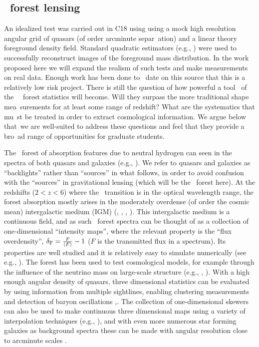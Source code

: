 \subsection{\lya\ forest lensing}


An idealized test was carried out in C18 using using a mock high
resolution angular grid of quasars (of order arcminute separ\ ation)
and a linear theory foreground density field. Standard quadratic
estimators (e.g., \cite{okamoto}) were used to successfully
reconstruct images of the foreground mass distribution. In the work
proposed here we will expand the realism of such tests and make
measurements on real data. Enough work has been done to \ date on this
source that this is a relatively low risk project. There is still the
question of how powerful a tool \atf\ of the \lya\ \ forest statistics
will become. Will they surpass the more traditional shape
mea\ surements for at least some range of redshift? What are the
systematics that mu\ st be treated in order to extract cosmological
information. We argue below that\ we are well-suited to address these
questions and feel that they provide a bro\ ad range of opportunities
for graduate students.




The \lya\ forest of absorption features due to neutral hydrogen can
seen in the spectra of both quasars \cite{rauch1998} and galaxies (e.g.,
\cite{savaglio2002}).  We refer to quasars and galaxies as
``backlights'' rather than ``sources'' in what follows, in order to
avoid confusion with the ``sources'' in gravitational lensing (which
will be the \lya\ forest here). At the redshifts ($2 < z
< 6$) where the \lya\ transition is in the optical wavelength
range, the forest absorption mostly arises in the moderately overdense
(of order the cosmic mean) intergalactic medium (IGM) (\cite{bi1993}, 
\cite{cen1994}, \cite{zhang1995}, \cite{hernquist1996}).
  This intergalactic medium is a continuous field, and as such
\lya\ forest spectra can be thought of as a collection of
one-dimensional ``intensity maps'',
where the relevant property is the ``flux overdensity'', $\delta_{\rm F}=\frac{F}{\langle F \rangle} -1$ ($F$
is the transmitted flux in a spectrum).  Its properties are well
studied and it is relatively easy to simulate numerically (see e.g.,
\cite{bolton2017}). The forest has been used to test
cosmological models, for example through the influence of the neutrino
mass on large-scale structure (e.g., \cite{pal2015}, \cite{croft1999}).
  With a high enough angular
density of quasars, three dimensional statistics can be evaluated by
using information from multiple sightlines, enabling clustering
measurements and detection of baryon
oscillations \citep{busca2013},. The
collection of one-dimensional skewers can also be used to make
continuous three dimensional maps using a variety of interpolation
techniques (e.g., \cite{cisewski}), and
with even more numerous star forming galaxies as background spectra
these can be made with angular resolution close to arcminute scales
\citep{Lee2014}.

